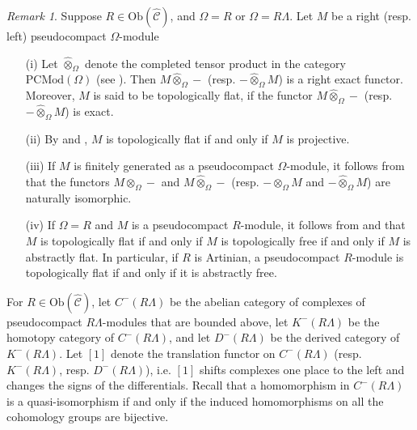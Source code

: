 \documentclass{amsart}
\theoremstyle{plain}
\theoremstyle{definition}
\theoremstyle{remark}
\newtheorem{rem}[thm]{Remark}
\begin{document}
\begin{rem}
\label{rem:topflat}
Suppose $R \in \mathrm{Ob}(\hat{\mathcal{C}})$, and $\Omega=R$ or $\Omega=R\Lambda$. 
Let $M$ be a right (resp. left) pseudocompact $\Omega$-module
\begin{enumerate}
\item[(i)]
Let $\hat{\otimes}_{\Omega}$ denote the completed tensor product in the category 
$\mathrm{PCMod}(\Omega)$ (see \cite[\S 2]{brumer}). Then $M\hat{\otimes}_\Omega- $ 
(resp. $-\hat{\otimes}_\Omega M$) is a right exact functor. Moreover,  $M$ is said to be 
topologically flat, if the functor $M\hat{\otimes}_{\Omega}-$ (resp. $-\hat{\otimes}_\Omega M$)
is exact.

\item[(ii)]
By \cite[Lemma 2.1(iii)]{brumer} and \cite[Prop. 3.1]{brumer}, $M$ is topologically flat if and only 
if $M$ is projective.

\item[(iii)]
If $M$ is finitely generated as a pseudocompact $\Omega$-module, it follows from
\cite[Lemma 2.1(ii)]{brumer} that the functors
$M \otimes_\Omega -$ and $M\hat{\otimes}_\Omega -$ (resp. $-\otimes_\Omega M$ and 
$-\hat{\otimes}_\Omega M$) are naturally isomorphic.

\item[(iv)]
If $\Omega=R$ and $M$ is a pseudocompact $R$-module,
it follows from \cite[Proof of Prop. 0.3.7]{ga2} and \cite[Cor. 0.3.8]{ga2} that $M$ is 
topologically flat if and only if $M$ is topologically free if and only if $M$ is abstractly flat.
In particular, if $R$ is Artinian, a pseudocompact $R$-module is topologically flat  if and only
if it is abstractly free.
\end{enumerate}
\end{rem}

For $R \in \mathrm{Ob}(\hat{\mathcal{C}})$, let $C^-(R\Lambda)$
be the abelian category of complexes of pseudocompact $R\Lambda$-modules that are bounded above, let $K^-(R\Lambda)$ be the homotopy category of $C^-(R\Lambda)$, and
let $D^-(R\Lambda)$ be the derived category of $K^-(R\Lambda)$. 
Let $[1]$ denote the translation functor on $C^-(R\Lambda)$ (resp. $K^-(R\Lambda)$, 
resp. $D^-(R\Lambda)$), 
i.e. $[1]$ shifts complexes
one place to the left and changes the signs of the differentials.
Recall that a homomorphism in $C^-(R\Lambda)$
is a quasi-isomorphism if and only if the induced homomorphisms on 
all the cohomology groups are bijective.
\end{document}
